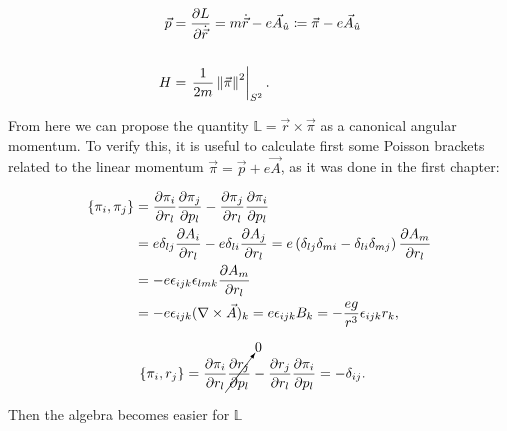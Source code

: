 \begin{equation*}
\begin{aligned}
\vec{p} &= \frac{\partial L}{\partial \dot{\vec{r}}} = m\dot{\vec{r}}-e\vec{A}_{\hat{u}} \coloneqq \vec{\pi}-e\vec{A}_{\hat{u}} \\
\\
H &= \left.\frac{1}{2m}\left\lVert \vec{\pi} \right\rVert^2\right|_{S^2}.
\end{aligned}
\end{equation*}

From here we can propose the quantity $\mathbb{L}= \vec{r}\times\vec{\pi}$ as a canonical angular momentum. To verify this, it is useful to calculate first some Poisson brackets related to the linear momentum $\vec{\pi} = \vec{p} + e\vec{A}$, as it was done in the first chapter:


\begin{align*}
\left\lbrace \pi_i, \pi_j \right\rbrace &= \frac{\partial \pi_i}{\partial r_l}\frac{\partial \pi_j}{\partial p_l} - \frac{\partial \pi_j}{\partial r_l}\frac{\partial \pi_i}{\partial p_l}\\
&= e\delta_{lj}\frac{\partial A_i}{\partial r_l} -e\delta_{li}\frac{\partial A_j}{\partial r_l}            = e\left( \delta_{lj}\delta_{mi} - \delta_{li}\delta_{mj} \right)\frac{\partial A_m}{\partial r_l} \\
&= -e\epsilon_{ijk}\epsilon_{lmk}\frac{\partial A_m}{\partial r_l}\\
&= -e\epsilon_{ijk}(\nabla \times \vec{A})_k = e\epsilon_{ijk}B_k = -\frac{eg}{r^3}\epsilon_{ijk}r_k,
\end{align*}

\begin{align*}
\left\lbrace \pi_i, r_j \right\rbrace &= \frac{\partial \pi_i}{\partial r_l}\cancelto{0}{\frac{\partial r_j}{\partial p_l}} - \frac{\partial r_j}{\partial r_l}\frac{\partial \pi_i}{\partial p_l} =  -\delta_{ij}.
\end{align*}

Then the algebra becomes easier for $\mathbb{L}$

